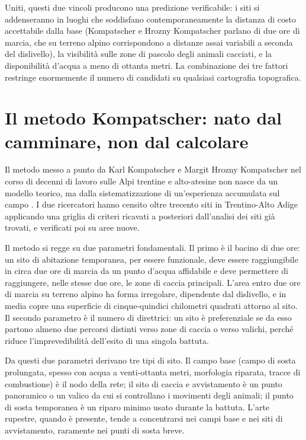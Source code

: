 Uniti, questi due vincoli producono una predizione verificabile: i siti si addenseranno in luoghi che soddisfano contemporaneamente la distanza di costo accettabile dalla base (Kompatscher e Hrozny Kompatscher parlano di due ore di marcia, che su terreno alpino corrispondono a distanze assai variabili a seconda del dislivello), la visibilità sulle zone di pascolo degli animali cacciati, e la disponibilità d'acqua a meno di ottanta metri. La combinazione dei tre fattori restringe enormemente il numero di candidati su qualsiasi cartografia topografica.

\section{Il metodo Kompatscher: nato dal camminare, non dal calcolare}

Il metodo messo a punto da Karl Kompatscher e Margit Hrozny Kompatscher nel corso di decenni di lavoro sulle Alpi trentine e alto-atesine non nasce da un modello teorico, ma dalla sistematizzazione di un'esperienza accumulata sul campo \citep{kompatscher2007}. I due ricercatori hanno censito oltre trecento siti in Trentino-Alto Adige applicando una griglia di criteri ricavati a posteriori dall'analisi dei siti già trovati, e verificati poi su aree nuove.

Il metodo si regge su due parametri fondamentali. Il primo è il bacino di due ore: un sito di abitazione temporanea, per essere funzionale, deve essere raggiungibile in circa due ore di marcia da un punto d'acqua affidabile e deve permettere di raggiungere, nelle stesse due ore, le zone di caccia principali. L'area entro due ore di marcia su terreno alpino ha forma irregolare, dipendente dal dislivello, e in media copre una superficie di cinque-quindici chilometri quadrati attorno al sito. Il secondo parametro è il numero di direttrici: un sito è preferenziale se da esso partono almeno due percorsi distinti verso zone di caccia o verso valichi, perché riduce l'imprevedibilità dell'esito di una singola battuta.

Da questi due parametri derivano tre tipi di sito. Il campo base (campo di sosta prolungata, spesso con acqua a venti-ottanta metri, morfologia riparata, tracce di combustione) è il nodo della rete; il sito di caccia e avvistamento è un punto panoramico o un valico da cui si controllano i movimenti degli animali; il punto di sosta temporanea è un riparo minimo usato durante la battuta. L'arte rupestre, quando è presente, tende a concentrarsi nei campi base e nei siti di avvistamento, raramente nei punti di sosta breve.

